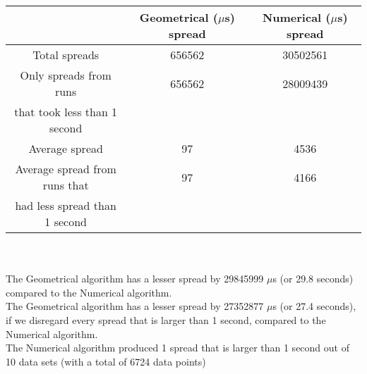 \begin{tabular}[3]{c|c|c}
 & Geometrical ($\mu$s) spread & Numerical ($\mu$s) spread\\
\hline
Total spreads & 656562 & 30502561 \\ 
\hline 
Only spreads from runs & 656562 & 28009439 \\ 
that took less than 1 second & & \\ 
\hline
Average spread & 97 & 4536 \\
\hline
Average spread from runs that & 97 & 4166 \\ 
had less spread than 1 second & & \\ 
\end{tabular}\\ \\
The Geometrical algorithm has a lesser spread by 29845999 $\mu$s (or 29.8 seconds) compared to the Numerical algorithm.\\
The Geometrical algorithm has a lesser spread by 27352877 $\mu$s (or 27.4 seconds), if we disregard every spread that is larger than 1 second, compared to the Numerical algorithm.\\
The Numerical algorithm produced 1 spread that is larger than 1 second out of 10 data sets (with a total of 6724 data points)\\
